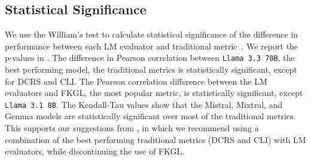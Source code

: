 \subsection{Statistical Significance}\label{appendix:sig-testing}
We use the William's test to calculate statistical significance of the difference in performance between each LM evaluator and traditional metric~\cite{graham-baldwin-2014-testing}. We report the p-values in . The difference in Pearson correlation between \texttt{Llama 3.3 70B}, the best performing model, the traditional metrics is statistically significant, except for DCRS and CLI. The Pearson correlation difference between the LM evaluators and FKGL, the most popular metric, is statistically significant, except \texttt{Llama 3.1 8B}. The Kendall-Tau values show that the Mistral, Mixtral, and Gemma models are statistically significant over most of the traditional metrics. This supports our suggestions from , in which we recommend using a combination of the best performing traditional metrics (DCRS and CLI) with LM evaluators, while discontinuing the use of FKGL. 

